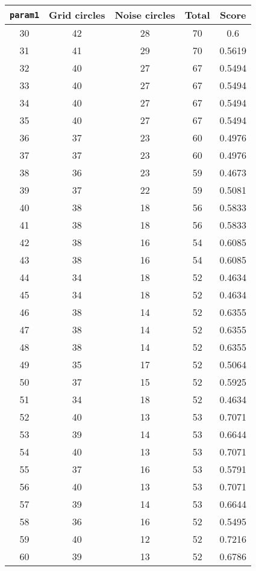 \documentclass[letterpaper, 12pt]{article}
\begin{document}
\begin{longtable}{|c|c|c|c|c|}
\hline
\textbf{\texttt{param1}} & \textbf{Grid circles} & \textbf{Noise circles} & \textbf{Total} & \textbf{Score} \\
\hline
30 & 42 & 28 & 70 & 0.6 \\
\hline
31 & 41 & 29 & 70 & 0.5619 \\
\hline
32 & 40 & 27 & 67 & 0.5494 \\
\hline
33 & 40 & 27 & 67 & 0.5494 \\
\hline
34 & 40 & 27 & 67 & 0.5494 \\
\hline
35 & 40 & 27 & 67 & 0.5494 \\
\hline
36 & 37 & 23 & 60 & 0.4976 \\
\hline
37 & 37 & 23 & 60 & 0.4976 \\
\hline
38 & 36 & 23 & 59 & 0.4673 \\
\hline
39 & 37 & 22 & 59 & 0.5081 \\
\hline
40 & 38 & 18 & 56 & 0.5833 \\
\hline
41 & 38 & 18 & 56 & 0.5833 \\
\hline
42 & 38 & 16 & 54 & 0.6085 \\
\hline
43 & 38 & 16 & 54 & 0.6085 \\
\hline
44 & 34 & 18 & 52 & 0.4634 \\
\hline
45 & 34 & 18 & 52 & 0.4634 \\
\hline
46 & 38 & 14 & 52 & 0.6355 \\
\hline
47 & 38 & 14 & 52 & 0.6355 \\
\hline
48 & 38 & 14 & 52 & 0.6355 \\
\hline
49 & 35 & 17 & 52 & 0.5064 \\
\hline
50 & 37 & 15 & 52 & 0.5925 \\
\hline
51 & 34 & 18 & 52 & 0.4634 \\
\hline
52 & 40 & 13 & 53 & 0.7071 \\
\hline
53 & 39 & 14 & 53 & 0.6644 \\
\hline
54 & 40 & 13 & 53 & 0.7071 \\
\hline
55 & 37 & 16 & 53 & 0.5791 \\
\hline
56 & 40 & 13 & 53 & 0.7071 \\
\hline
57 & 39 & 14 & 53 & 0.6644 \\
\hline
58 & 36 & 16 & 52 & 0.5495 \\
\hline
59 & 40 & 12 & 52 & 0.7216 \\
\hline
60 & 39 & 13 & 52 & 0.6786 \\

\end{longtable}
\end{document}
